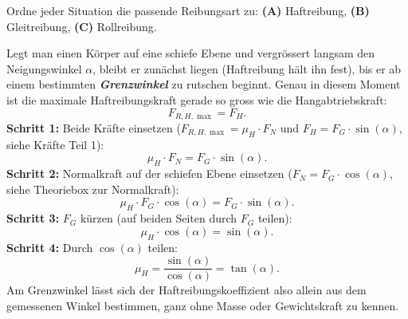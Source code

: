 \documentclass[addpoints,11pt,a4paper]{exam}
\newlength{\antwortraumlen}
\newcommand{\Antwortraum}[1]{%
  \pgfmathsetlength{\antwortraumlen}{#1*2.5cm}%
  \begin{answerbox}
    \rule{0pt}{\antwortraumlen}%
  \end{answerbox}%
}
\begin{document}
\begin{questions}
\begin{taskbox}
\question[3] Ordne jeder Situation die passende Reibungsart zu:
\textbf{(A)} Haftreibung, \textbf{(B)} Gleitreibung, \textbf{(C)} Rollreibung.

\end{taskbox}
\end{questions}

\begin{theoriebox}[Der Grenzwinkel der schiefen Ebene: $\mu_H = \tan(\alpha)$]
Legt man einen Körper auf eine schiefe Ebene und vergrössert langsam den
Neigungswinkel $\alpha$, bleibt er zunächst liegen (Haftreibung hält ihn
fest), bis er ab einem bestimmten \textbf{\emph{Grenzwinkel}} zu rutschen
beginnt. Genau in diesem Moment ist die maximale Haftreibungskraft gerade
so gross wie die Hangabtriebskraft:
\[
  F_{R,H,\max} = F_H.
\]
\textbf{Schritt 1:} Beide Kräfte einsetzen ($F_{R,H,\max}=\mu_H\cdot F_N$
und $F_H=F_G\cdot\sin(\alpha)$, siehe Kräfte Teil 1):
\[
  \mu_H\cdot F_N = F_G\cdot\sin(\alpha).
\]
\textbf{Schritt 2:} Normalkraft auf der schiefen Ebene einsetzen
($F_N=F_G\cdot\cos(\alpha)$, siehe Theoriebox zur Normalkraft):
\[
  \mu_H\cdot F_G\cdot\cos(\alpha) = F_G\cdot\sin(\alpha).
\]
\textbf{Schritt 3:} $F_G$ kürzen (auf beiden Seiten durch $F_G$ teilen):
\[
  \mu_H\cdot\cos(\alpha) = \sin(\alpha).
\]
\textbf{Schritt 4:} Durch $\cos(\alpha)$ teilen:
\[
  \boxed{\mu_H = \frac{\sin(\alpha)}{\cos(\alpha)} = \tan(\alpha)}.
\]
Am Grenzwinkel lässt sich der Haftreibungskoeffizient also allein aus dem
gemessenen Winkel bestimmen, ganz ohne Masse oder Gewichtskraft zu
kennen.
\end{theoriebox}
\end{document}
